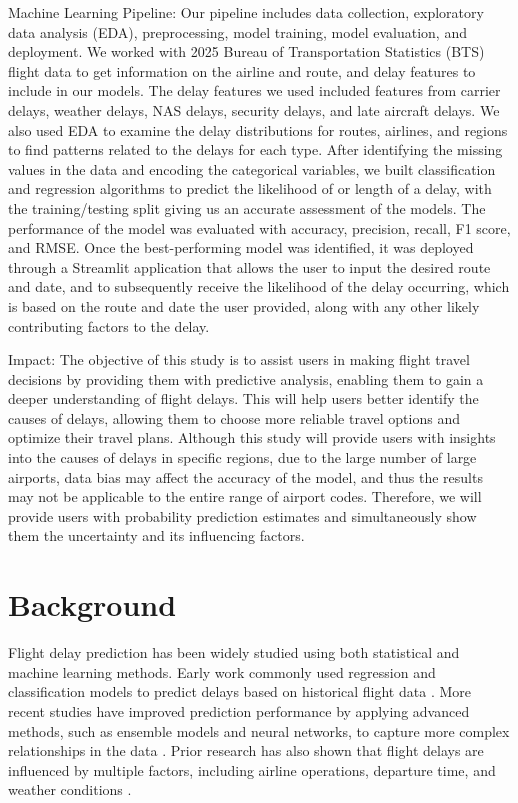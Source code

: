 Machine Learning Pipeline: Our pipeline includes data collection, exploratory data analysis (EDA), preprocessing, model training, model evaluation, and deployment. We worked with 2025 Bureau of Transportation Statistics (BTS) flight data to get information on the airline and route, and delay features to include in our models. The delay features we used included features from carrier delays, weather delays, NAS delays, security delays, and late aircraft delays. We also used EDA to examine the delay distributions for routes, airlines, and regions to find patterns related to the delays for each type. After identifying the missing values in the data and encoding the categorical variables, we built classification and regression algorithms to predict the likelihood of or length of a delay, with the training/testing split giving us an accurate assessment of the models. The performance of the model was evaluated with accuracy, precision, recall, F1 score, and RMSE. Once the best-performing model was identified, it was deployed through a Streamlit application that allows the user to input the desired route and date, and to subsequently receive the likelihood of the delay occurring, which is based on the route and date the user provided, along with any other likely contributing factors to the delay.

Impact: The objective of this study is to assist users in making flight travel decisions by providing them with predictive analysis, enabling them to gain a deeper understanding of flight delays. This will help users better identify the causes of delays, allowing them to choose more reliable travel options and optimize their travel plans. Although this study will provide users with insights into the causes of delays in specific regions, due to the large number of large airports, data bias may affect the accuracy of the model, and thus the results may not be applicable to the entire range of airport codes. Therefore, we will provide users with probability prediction estimates and simultaneously show them the uncertainty and its influencing factors.

\section{Background}

Flight delay prediction has been widely studied using both statistical and machine learning methods. Early work commonly used regression and classification models to predict delays based on historical flight data \cite{tang2021airline}. More recent studies have improved prediction performance by applying advanced methods, such as ensemble models and neural networks, to capture more complex relationships in the data \cite{jiang2020aviation}. Prior research has also shown that flight delays are influenced by multiple factors, including airline operations, departure time, and weather conditions \cite{choi2016weather}.

